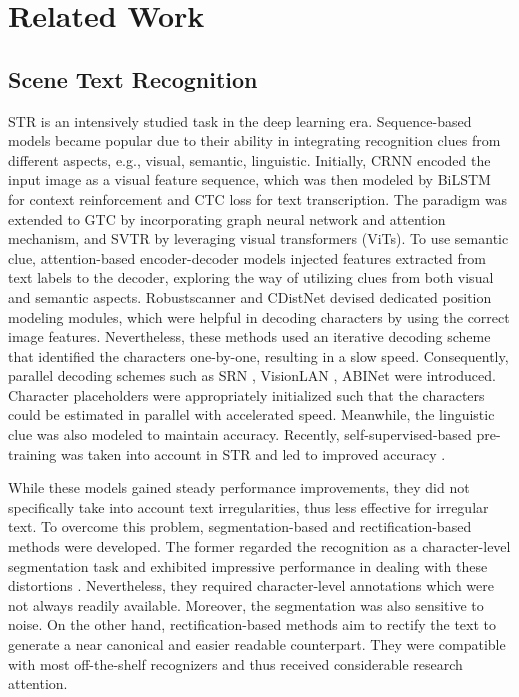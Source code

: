 \documentclass{article}
\begin{document}
\section{Related Work}
\subsection{Scene Text Recognition}
STR is an intensively studied task in the deep learning era. Sequence-based models became popular due to their ability in integrating recognition clues from different aspects, e.g., visual, semantic, linguistic. Initially, CRNN \cite{ShiBY17crnn} encoded the input image as a visual feature sequence, which was then modeled by BiLSTM for context reinforcement and CTC loss for text transcription. The paradigm was extended to GTC \cite{hu2020gtc} by incorporating graph neural network and attention mechanism, and SVTR \cite{du2022@svtr} by leveraging visual transformers (ViTs). 
To use semantic clue, attention-based encoder-decoder models \cite{lee2016attention_origin,cheng2017focusing_attention,fang2018attention,sheng2019nrtr,bhunia2021jvsr} injected features extracted from text labels to the decoder, exploring the way of utilizing clues from both visual and semantic aspects. Robustscanner \cite{yue2020robustscanner} and CDistNet \cite{zheng2021cdistnet} devised dedicated position modeling modules, which were helpful in decoding characters by using the correct image features. Nevertheless, these methods used an iterative decoding scheme that identified the characters one-by-one, resulting in a slow speed. Consequently, parallel decoding schemes such as SRN \cite{SRNyu2020towards}, VisionLAN \cite{wang2021FTO}, ABINet \cite{ABInet21CVPR} were introduced. Character placeholders were appropriately initialized such that the characters could be estimated in parallel with accelerated speed. Meanwhile, the linguistic clue was also modeled to maintain accuracy. Recently, self-supervised-based pre-training was taken into account in STR and led to improved accuracy \cite{yang2022reading,yu2023structextv2}.

While these models gained steady performance improvements, they did not specifically take into account text irregularities, thus less effective for irregular text. To overcome this problem, segmentation-based and rectification-based methods were developed. The former regarded the recognition as a character-level segmentation task and exhibited impressive performance in dealing with these distortions \cite{liu2018charnet,liao2019two_dim_per,xing2019convolutional,li2017fcsem}. Nevertheless, they required character-level annotations which were not always readily available. Moreover, the segmentation was also sensitive to noise. On the other hand, rectification-based methods aim to rectify the text to generate a near canonical and easier readable counterpart. They were compatible with most off-the-shelf recognizers and thus received considerable research attention.
\end{document}

